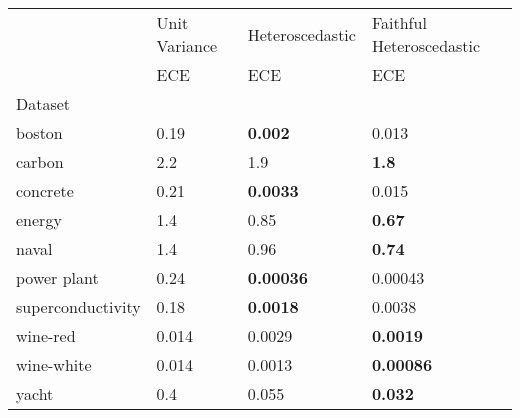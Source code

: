 \begin{tabular}{l|l|l|l}
\toprule
 & Unit Variance & Heteroscedastic & Faithful Heteroscedastic \\
 & ECE & ECE & ECE \\
Dataset &  &  &  \\
\midrule
boston & 0.19 & \bfseries 0.002 & 0.013 \\
carbon & 2.2 & 1.9 & \bfseries 1.8 \\
concrete & 0.21 & \bfseries 0.0033 & 0.015 \\
energy & 1.4 & 0.85 & \bfseries 0.67 \\
naval & 1.4 & 0.96 & \bfseries 0.74 \\
power plant & 0.24 & \bfseries 0.00036 & 0.00043 \\
superconductivity & 0.18 & \bfseries 0.0018 & 0.0038 \\
wine-red & 0.014 & 0.0029 & \bfseries 0.0019 \\
wine-white & 0.014 & 0.0013 & \bfseries 0.00086 \\
yacht & 0.4 & 0.055 & \bfseries 0.032 \\
\bottomrule
\end{tabular}
